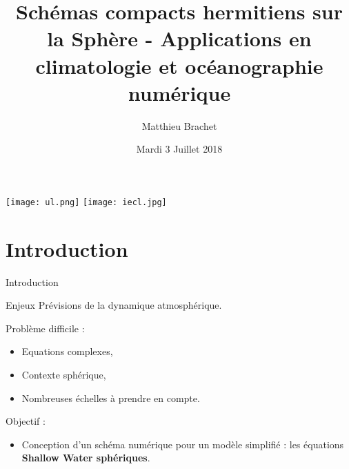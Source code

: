 \documentclass[11pt]{beamer}
\author[M. Brachet]{Matthieu Brachet}
\title[Soutenance de thèse]{Schémas compacts hermitiens sur la Sphère - Applications en climatologie et océanographie numérique}
\date[3-7-2018]{Mardi 3 Juillet 2018}
\begin{document}
\begin{frame}
\titlepage
\begin{flushright}
\texttt{[image: ul.png]}
\texttt{[image: iecl.jpg]}
\end{flushright}
\end{frame}


\begin{frame}
\tableofcontents
\end{frame}

\section{Introduction}
\begin{frame}{Introduction}
\begin{block}{Enjeux}
Prévisions de la dynamique atmosphérique.
\end{block}

\begin{alertblock}{}
Problème difficile :
\begin{itemize}
\item Equations complexes,
\item Contexte sphérique,
\item Nombreuses échelles à prendre en compte.
\end{itemize}
\end{alertblock}

\begin{exampleblock}{Objectif :}
\begin{itemize}
\item Conception d'un schéma numérique pour un modèle simplifié : les équations \textbf{Shallow Water sphériques}.
\end{itemize}
\end{exampleblock}
\end{frame}
\end{document}
